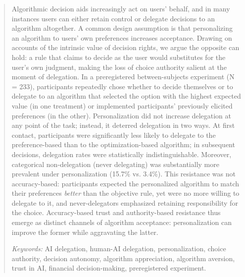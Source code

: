 \documentclass[a4paper, 12pt, fleqn]{article}
\theoremstyle{definition}
\begin{document}
\begin{abstract}
  Algorithmic decision aids increasingly act on users’ behalf, and in many instances users can either retain control or delegate decisions to an algorithm altogether. A common design assumption is that personalizing an algorithm to users' own preferences increases acceptance. Drawing on accounts of the intrinsic value of decision rights, we argue the opposite can hold: a rule that claims to decide as the user would substitutes for the user's own judgment, making the loss of choice authority salient at the moment of delegation. In a preregistered between-subjects experiment (N = 233), participants repeatedly chose whether to decide themselves or to delegate to an algorithm that selected the option with the highest expected value (in one treatment) or implemented participants' previously elicited preferences (in the other). Personalization did not increase delegation at any point of the task; instead, it deterred delegation in two ways. At first contact, participants were significantly less likely to delegate to the preference-based than to the optimization-based algorithm; in subsequent decisions, delegation rates were statistically indistinguishable. Moreover, categorical non-delegation (never delegating) was substantially more prevalent under personalization (15.7\% vs. 3.4\%). 
  This resistance was not accuracy-based: participants expected the personalized algorithm to match their preferences \emph{better} than the objective rule, yet were no more willing to delegate to it, and never-delegators emphasized retaining responsibility for the choice. Accuracy-based trust and authority-based resistance thus emerge as distinct channels of algorithm acceptance: personalization can improve the former while aggravating the latter.
  
     \vspace{.25cm}
  \textit{Keywords:} {AI delegation, human-AI delegation, personalization, choice authority, decision autonomy, algorithm appreciation, algorithm aversion, trust in AI, financial decision-making, preregistered experiment.}\vspace{.15cm}
\end{abstract}
\vspace{-.5cm}
\end{document}
